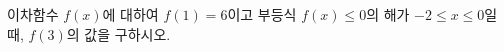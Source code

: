 \hspace*{2mm}\begin{minipage}[t]{\dimexpr\linewidth-2mm\relax}\vspace{0pt}
이차함수 $f(x)$에 대하여 $f(1)=6$이고 부등식 $f(x)\le 0$의 해가 $-2\le x\le 0$일 때, $f(3)$의 값을 구하시오.\end{minipage}
